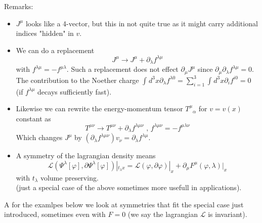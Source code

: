 \documentclass{report}
\begin{document}
Remarks:
\begin{itemize}
  \item $J^{\mu} $ looks like a 4-vector, but this in not quite true as it might carry additional indices "hidden" in $v$.
  \item We can do a replacement \[
  J^{\mu} \to J^{\mu} + \partial_\lambda f^{\lambda \mu}  
\] with $f^{\lambda \mu} = - f ^{\mu \lambda} $. Such a replacement does not effect $\partial_\mu J^{\mu} $ since $\partial_\mu \partial_\lambda f^{\lambda \mu} = 0$. The contribution to the Noether charge  $\int_{}^{} d^3x \partial_\lambda f^{\lambda 0 } = \sum_{i=1}^{3} \int_{}^{} d^3x \partial_i f^{i 0 } = 0 $ (if $f^{\lambda \mu} $ decays sufficiently fast).
  \item Likewise we can rewrite the energy-momentum tensor $T^{\mu}_{\text{ } \alpha} $ for $v = v( x )$ constant as \[
  T^{\mu\nu} \to T^{\mu\nu} + \partial_\lambda f^{\lambda \mu \nu} \text{ , } f^{\lambda \mu \nu} = - f^{\mu \lambda \nu} 
\] Which changes $J^{\mu} $ by $\left( \partial_\lambda f^{\lambda \mu \nu}  \right) v_\nu = \partial_\lambda f^{\lambda \mu} $.
  \item A symmetry of the lagrangian density means \[
  \mathcal{L} \left( \Psi^{\lambda}\left[ \varphi \right] , \partial \Psi^{\lambda} \left[ \varphi \right]  \right) |_{t_\lambda x} = \mathcal{L} \left( \varphi, \partial \varphi \right) |_x + \partial_\mu F^{\mu} \left( \varphi, \lambda \right) |_x
  \] with $t_\lambda$ volume preserving. \\
  (just a special case of the above sometimes more usefull in applications).
\end{itemize}
A for the examlpes below we look at symmetries that fit the special case just introduced, sometimes even with $F = 0$ (we say the lagrangian $\mathcal{L} $ is invariant).
\end{document}
